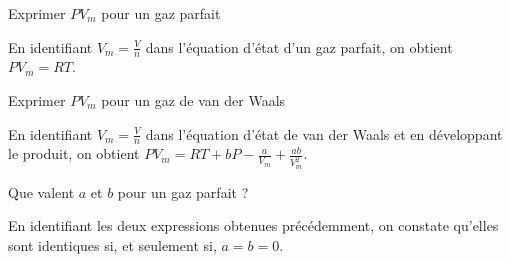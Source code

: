 \begin{enonce}
Exprimer $PV_m$ pour un gaz parfait
\end{enonce}


\begin{corrige}
En identifiant $V_m=\frac{V}{n}$ dans l'équation d'état d'un gaz parfait, on obtient $PV_m=RT$.
\end{corrige}



\begin{enonce}
Exprimer $PV_m$ pour un gaz de van der Waals
\end{enonce}


\begin{corrige}
En identifiant $V_m=\frac{V}{n}$ dans l'équation d'état de van der Waals et en développant le produit, on obtient $PV_m=RT+bP-\frac{a}{V_m}+\frac{ab}{V_m^2}$.
\end{corrige}



\begin{enonce}
Que valent $a$ et $b$ pour un gaz parfait ?
\end{enonce}


\begin{corrige}
En identifiant les deux expressions obtenues précédemment, on constate qu'elles sont identiques si, et seulement si, $a=b=0$.
\end{corrige}


\finEntrainement




\vspace{1cm}





